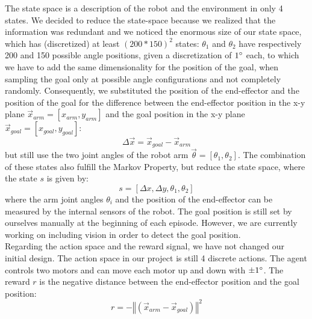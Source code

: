 \documentclass{article}
\begin{document}
\vspace{\baselineskip}

The state space is a description of the robot and the environment in only 4 states. We decided to reduce the state-space because we realized that the information was redundant and we noticed the enormous size of our state space, which has (discretized) at least $(200*150)^2$ states: $\theta_1$ and $\theta_2$ have respectively 200 and 150 possible angle positions, given a discretization of $1\degree$ each, to which we have to add the same dimensionality for the position of the goal, when sampling the goal only at possible angle configurations and not completely randomly. Consequently, we substituted the position of the end-effector and the position of the goal for the difference between the end-effector position in the x-y plane $\vec{x}_{arm} = [x_{arm}, y_{arm}]$ and the goal position in the x-y plane $\vec{x}_{goal} = [x_{goal}, y_{goal}]$:
\begin{equation}
\Delta \vec{x} = \vec{x}_{goal} - \vec{x}_{arm}
\end{equation}
but still use the two joint angles of the robot arm $\vec{\theta} = [\theta_1, \theta_2]$. The combination of these states also fulfill the Markov Property, but reduce the state space, where the state $s$ is given by:
\begin{equation}
s = [\Delta x, \Delta y, \theta_1, \theta_2]
\end{equation} 
where the arm joint angles $\theta_i$ and the position of the end-effector can be measured by the internal sensors of the robot. The goal position is still set by ourselves manually at the beginning of each episode. However, we are currently working on including vision in order to detect the goal position.
\\
Regarding the action space and the reward signal, we have not changed our initial design. The action space in our project is still 4 discrete actions. The agent controls two motors and can move each motor up and down with $\pm1\degree$. 
The reward $r$ is the negative distance between the end-effector position and the goal position:
\begin{equation}
r = -\left\Vert\left( \vec{x}_{arm} - \vec{x}_{goal} \right) \right\Vert^2
\end{equation}
\end{document}
